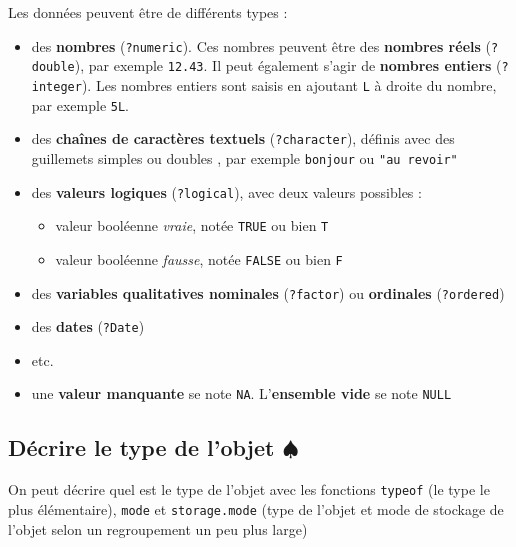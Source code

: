 \documentclass[
]{book}
\providecommand{\tightlist}{%
  \setlength{\itemsep}{0pt}\setlength{\parskip}{0pt}}
\begin{document}
Les données peuvent être de différents types :

\begin{itemize}
\tightlist
\item
  des \textbf{nombres} (\texttt{?numeric}). Ces nombres peuvent être des \textbf{nombres réels} (\texttt{?double}), par exemple \texttt{12.43}. Il peut également s'agir de \textbf{nombres entiers} (\texttt{?integer}). Les nombres entiers sont saisis en ajoutant \texttt{L} à droite du nombre, par exemple \texttt{5L}.
\item
  des \textbf{chaînes de caractères textuels} (\texttt{?character}), définis avec des guillemets simples ou doubles , par exemple \texttt{\textquotesingle{}bonjour\textquotesingle{}} ou \texttt{"au\ revoir"}
\item
  des \textbf{valeurs logiques} (\texttt{?logical}), avec deux valeurs possibles :

  \begin{itemize}
  \tightlist
  \item
    valeur booléenne \emph{vraie}, notée \texttt{TRUE} ou bien \texttt{T}
  \item
    valeur booléenne \emph{fausse}, notée \texttt{FALSE} ou bien \texttt{F}
  \end{itemize}
\item
  des \textbf{variables qualitatives nominales} (\texttt{?factor}) ou \textbf{ordinales} (\texttt{?ordered})
\item
  des \textbf{dates} (\texttt{?Date})
\item
  etc.
\item
  une \textbf{valeur manquante} se note \texttt{NA}. L'\textbf{ensemble vide} se note \texttt{NULL}
\end{itemize}

\subsection{\texorpdfstring{Décrire le type de l'objet \(\spadesuit\)}{Décrire le type de l'objet \textbackslash spadesuit}}\label{duxe9crire-le-type-de-lobjet-spadesuit}

On peut décrire quel est le type de l'objet avec les fonctions \texttt{typeof} (le type le plus élémentaire), \texttt{mode} et \texttt{storage.mode} (type de l'objet et mode de stockage de l'objet selon un regroupement un peu plus large)
\end{document}
